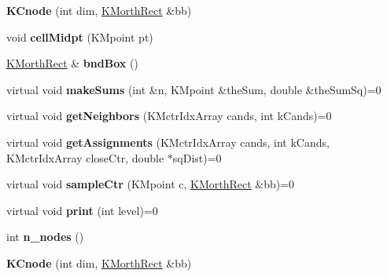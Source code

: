 \begin{DoxyCompactItemize}
\item 
\hypertarget{class_k_cnode_aaea3bc24c586d43f51d8a0c4ccdf67ec}{
{\bfseries KCnode} (int dim, \hyperlink{class_k_morth_rect}{KMorthRect} \&bb)}
\label{class_k_cnode_aaea3bc24c586d43f51d8a0c4ccdf67ec}

\item 
\hypertarget{class_k_cnode_a5b5773ce288b6c74672f3cf69680a641}{
void {\bfseries cellMidpt} (KMpoint pt)}
\label{class_k_cnode_a5b5773ce288b6c74672f3cf69680a641}

\item 
\hypertarget{class_k_cnode_a2b34a6aa625295007d8d22589bace1ea}{
\hyperlink{class_k_morth_rect}{KMorthRect} \& {\bfseries bndBox} ()}
\label{class_k_cnode_a2b34a6aa625295007d8d22589bace1ea}

\item 
\hypertarget{class_k_cnode_a15c8f4f8d55f8c25fceecfba37ab3dc2}{
virtual void {\bfseries makeSums} (int \&n, KMpoint \&theSum, double \&theSumSq)=0}
\label{class_k_cnode_a15c8f4f8d55f8c25fceecfba37ab3dc2}

\item 
\hypertarget{class_k_cnode_a54edaaee5ac961b2544bddff41e4ebdb}{
virtual void {\bfseries getNeighbors} (KMctrIdxArray cands, int kCands)=0}
\label{class_k_cnode_a54edaaee5ac961b2544bddff41e4ebdb}

\item 
\hypertarget{class_k_cnode_a5fb6ad1afd76a4139ea7c29c0948e115}{
virtual void {\bfseries getAssignments} (KMctrIdxArray cands, int kCands, KMctrIdxArray closeCtr, double $\ast$sqDist)=0}
\label{class_k_cnode_a5fb6ad1afd76a4139ea7c29c0948e115}

\item 
\hypertarget{class_k_cnode_ab2cdcff0393586c4abd13396d118195f}{
virtual void {\bfseries sampleCtr} (KMpoint c, \hyperlink{class_k_morth_rect}{KMorthRect} \&bb)=0}
\label{class_k_cnode_ab2cdcff0393586c4abd13396d118195f}

\item 
\hypertarget{class_k_cnode_ab98ac20f92985bb47fad751f422b8cbb}{
virtual void {\bfseries print} (int level)=0}
\label{class_k_cnode_ab98ac20f92985bb47fad751f422b8cbb}

\item 
\hypertarget{class_k_cnode_af54654f803bbd48b66a5298c1edbe519}{
int {\bfseries n\_\-nodes} ()}
\label{class_k_cnode_af54654f803bbd48b66a5298c1edbe519}

\item 
\hypertarget{class_k_cnode_aaea3bc24c586d43f51d8a0c4ccdf67ec}{
{\bfseries KCnode} (int dim, \hyperlink{class_k_morth_rect}{KMorthRect} \&bb)}
\label{class_k_cnode_aaea3bc24c586d43f51d8a0c4ccdf67ec}


\end{DoxyCompactItemize}
